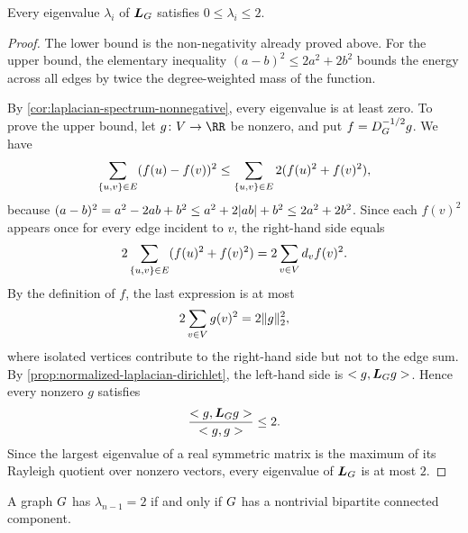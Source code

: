 \begin{lemma}
	\label{lem:laplacian-spectrum-interval}
	Every eigenvalue \(\lambda_i\) of \(\boldsymbol{L}_{G}\) satisfies \(0\leq \lambda_i\leq 2\).
\end{lemma}

\begin{proof}
	The lower bound is the non-negativity already proved above. For the upper bound, the elementary inequality \((a-b)^2\leq 2a^2+2b^2\) bounds the energy across all edges by twice the degree-weighted mass of the function.

	By \cref{cor:laplacian-spectrum-nonnegative}, every eigenvalue is at least zero. To prove the upper bound, let \(g\colon \Vertices\to\RR\) be nonzero, and put \(f=D_{G}^{-1/2}g\). We have
	\begin{equation}
		\sum_{\{u,v\}\in E}(f(u)-f(v))^2
		\leq
		\sum_{\{u,v\}\in E}2(f(u)^2+f(v)^2),
	\end{equation}
	because \((a-b)^2=a^2-2ab+b^2\leq a^2+2\lvert ab\rvert+b^2\leq 2a^2+2b^2\). Since each \(f(v)^2\) appears once for every edge incident to \(v\), the right-hand side equals
	\begin{equation}
		2\sum_{\{u,v\}\in E}(f(u)^2+f(v)^2)=2\sum_{v\in V}d_v f(v)^2.
	\end{equation}
	By the definition of \(f\), the last expression is at most
	\begin{equation}
		2\sum_{v\in V}g(v)^2=2\lVert g\rVert_2^2,
	\end{equation}
	where isolated vertices contribute to the right-hand side but not to the edge sum. By \cref{prop:normalized-laplacian-dirichlet}, the left-hand side is \(< g,\boldsymbol{L}_{G}g>\). Hence every nonzero \(g\) satisfies
	\begin{equation}
		\frac{< g,\boldsymbol{L}_{G}g>}{< g,g>}\leq 2.
	\end{equation}
	Since the largest eigenvalue of a real symmetric matrix is the maximum of its Rayleigh quotient over nonzero vectors, every eigenvalue of \(\boldsymbol{L}_{G}\) is at most \(2\).
\end{proof}

\begin{lemma}
	\label{lem:top-eigenvalue-bipartite}
	A graph \(G\) has \(\lambda_{n-1}=2\) if and only if \(G\) has a nontrivial bipartite connected component.
\end{lemma}

